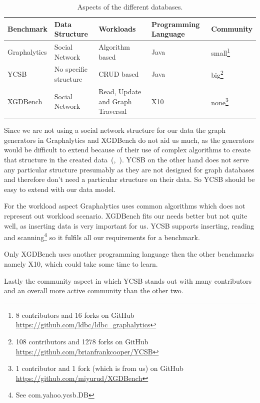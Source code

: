 \begin{table}[!h]
  \begin{minipage}{\textwidth}
    \begin{tabularx}{\textwidth}{ | l | X | X | X | l | }
      \hline
      Benchmark & Data Structure & Workloads & Programming Language & Community \\ \hline
      Graphalytics & Social Network & Algorithm based & Java & small\footnote{8 contributors and 16 forks on GitHub \url{https://github.com/ldbc/ldbc_graphalytics}} \\ \hline
      YCSB & No specific structure & CRUD based & Java & big\footnote{108 contributors and 1278 forks on GitHub \url{https://github.com/brianfrankcooper/YCSB}} \\ \hline
      XGDBench & Social Network & Read, Update and Graph Traversal & X10 & none\footnote{1 contributor and 1 fork (which is from us) on GitHub \url{https://github.com/miyurud/XGDBench}} \\ \hline
    \end{tabularx}
  \end{minipage}
  \caption{Aspects of the different databases.}
  \label{tab:benchmarkComparison}
\end{table}

Since we are not using a social network structure for our data the graph generators in Graphalytics and XGDBench do not aid us much,
as the generators would be difficult to extend because of their use of complex algorithms to create that structure in the created data~(\cite{Erling2015},~\cite{Dayarathna2012}).
YCSB on the other hand does not serve any particular structure presumably as they are not designed for graph databases and therefore don't need a particular structure on their data.
So YCSB should be easy to extend with our data model.

For the workload aspect Graphalytics uses common algorithms which does not represent out workload scenario.
XGDBench fits our needs better but not quite well, as inserting data is very important for us.
YCSB supports inserting, reading and scanning\footnote{See com.yahoo.ycsb.DB} so it fulfils all our requirements for a benchmark.

Only XGDBench uses another programming language then the other benchmarks namely X10,
which could take some time to learn.

Lastly the community aspect in which YCSB stands out with many contributors and an overall more active community than the other two.

